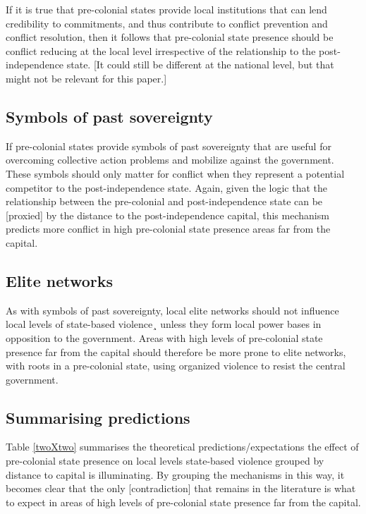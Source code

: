 \documentclass[12pt]{article}
\begin{document}
If it is true that pre-colonial states provide local institutions that can lend
credibility to commitments, and thus contribute to conflict prevention and
conflict resolution, then it follows that pre-colonial state presence should be
conflict reducing at the local level irrespective of the relationship to the
post-independence state. [It could still be different at the national level, but
that might not be relevant for this paper.]

\subsection{Symbols of past sovereignty} \label{Symbols of sovereignty}

If pre-colonial states provide symbols of past sovereignty that are useful for
overcoming collective action problems and mobilize against the government. These
symbols should only matter for conflict when they represent a potential
competitor to the post-independence state. Again, given the logic that the
relationship between the pre-colonial and post-independence state can be
[proxied] by the distance to the post-independence capital, this mechanism
predicts more conflict in high pre-colonial state presence areas far from the
capital.

\subsection{Elite networks} \label{Elite networks}

As with symbols of past sovereignty, local elite networks should not influence
local levels of state-based violence¸ unless they form local power bases in
opposition to the government. Areas with high levels of pre-colonial state
presence far from the capital should therefore be more prone to elite networks,
with roots in a pre-colonial state, using organized violence to resist the
central government.

\subsection{Summarising predictions} \label{Summarising predictions}

Table \ref{twoXtwo} summarises the theoretical predictions/expectations the
effect of pre-colonial state presence on local levels state-based violence
grouped by distance to capital is illuminating. By grouping the mechanisms in
this way, it becomes clear that the only [contradiction] that remains in the
literature is what to expect in areas of high levels of pre-colonial state
presence far from the capital. 
\end{document}
